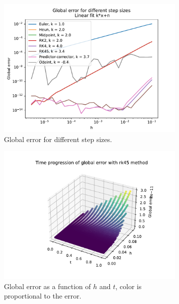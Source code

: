 \documentclass[12pt, a4paper]{article}
\begin{document}
\begin{figure}[hbtp]
  \begin{subfigure}{0.5\textwidth}
  \includegraphics[width=\linewidth]{graphs/error_h.pdf}
  \caption{Global error for different step sizes.} \label{fig:a}
  \end{subfigure}
  \hspace*{\fill}
  \begin{subfigure}{0.5\textwidth}
  \includegraphics[width=\linewidth]{graphs/error_3D.pdf}
  \caption{Global error as a function of $h$ and $t$, color is proportional to the error.} \label{fig:b}
  \end{subfigure}
  \medskip
  \begin{subfigure}{0.5\textwidth}

\end{subfigure}
\end{figure}
\end{document}
